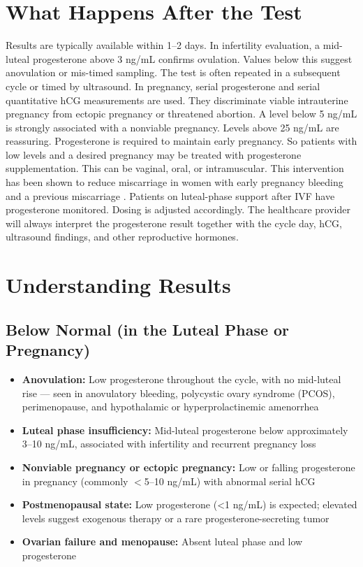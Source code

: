 \section*{What Happens After the Test}
Results are typically available within 1--2 days. In infertility evaluation, a mid-luteal progesterone above 3 ng/mL confirms ovulation. Values below this suggest anovulation or mis-timed sampling. The test is often repeated in a subsequent cycle or timed by ultrasound. In pregnancy, serial progesterone and serial quantitative hCG measurements are used. They discriminate viable intrauterine pregnancy from ectopic pregnancy or threatened abortion. A level below 5 ng/mL is strongly associated with a nonviable pregnancy. Levels above 25 ng/mL are reassuring. Progesterone is required to maintain early pregnancy. So patients with low levels and a desired pregnancy may be treated with progesterone supplementation. This can be vaginal, oral, or intramuscular. This intervention has been shown to reduce miscarriage in women with early pregnancy bleeding and a previous miscarriage \cite{coomarasamy2019randomized}. Patients on luteal-phase support after IVF have progesterone monitored. Dosing is adjusted accordingly. The healthcare provider will always interpret the progesterone result together with the cycle day, hCG, ultrasound findings, and other reproductive hormones.

\section*{Understanding Results}

\subsection*{Below Normal (in the Luteal Phase or Pregnancy)}
\begin{itemize}
  \item \textbf{Anovulation:} Low progesterone throughout the cycle, with no mid-luteal rise --- seen in anovulatory bleeding, polycystic ovary syndrome (PCOS), perimenopause, and hypothalamic or hyperprolactinemic amenorrhea
  \item \textbf{Luteal phase insufficiency:} Mid-luteal progesterone below approximately 3--10 ng/mL, associated with infertility and recurrent pregnancy loss
  \item \textbf{Nonviable pregnancy or ectopic pregnancy:} Low or falling progesterone in pregnancy (commonly $<$5--10 ng/mL) with abnormal serial hCG
  \item \textbf{Postmenopausal state:} Low progesterone (<1 ng/mL) is expected; elevated levels suggest exogenous therapy or a rare progesterone-secreting tumor
  \item \textbf{Ovarian failure and menopause:} Absent luteal phase and low progesterone
\end{itemize}

